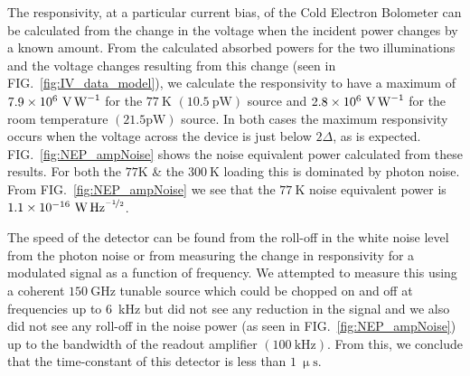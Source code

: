 \documentclass[aip, apl, a4paper, amsmath,amssymb, reprint]{revtex4-1}
\begin{document}
The responsivity, at a particular current bias, of the Cold Electron Bolometer can be calculated from the change in the voltage when the incident power changes by a known amount. From the calculated absorbed powers for the two illuminations and the voltage changes resulting from this change (seen in  FIG.~\ref{fig:IV_data_model}), we calculate the responsivity to have a maximum of $7.9 \times 10^{6}~\mathrm{\mbox{V\,W}^{-1}}$ for the $77~\mathrm{K}$ $(10.5~\mathrm{pW})$ source and $2.8 \times 10^{6}~\mathrm{\mbox{V\,W}^{-1}}$ for the room temperature $(21.5\mathrm{pW})$ source. In both cases the maximum responsivity occurs when the voltage across the device is just below $2\Delta$, as is expected. FIG.~\ref{fig:NEP_ampNoise} shows the noise equivalent power calculated from these results. For both the $77\mathrm{K}$ \& the $300~\mathrm{K}$ loading this is dominated by photon noise. From FIG.~\ref{fig:NEP_ampNoise} we see that the $77~\mathrm{K}$ noise equivalent power is $1.1 \times 10^{-16}~\mathrm{\mbox{W\,Hz}^{\nicefrac{-1}{2}}}$.

The speed of the detector can be found from the roll-off in the white noise level from the photon noise or from measuring the change in responsivity for a modulated signal as a function of frequency. We attempted to measure this using a coherent $150~\mathrm{GHz}$ tunable source which could be chopped on and off at frequencies up to 6~kHz but did not see any reduction in the signal and we also did not see any roll-off in the noise power (as seen in FIG.~\ref{fig:NEP_ampNoise}) up to the bandwidth of the readout amplifier $\left(100~\mathrm{kHz}\right)$. From this, we conclude that the time-constant of this detector is less than $1~\mathrm{\upmu s}$.
\end{document}
